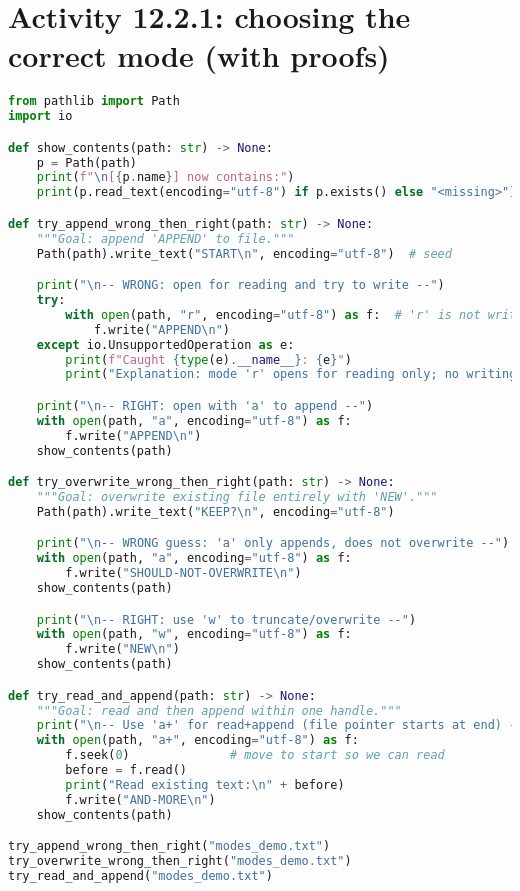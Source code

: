 \section{Activity 12.2.1: choosing the correct mode (with proofs)}
\begin{lstlisting}[language=Python, caption={Try wrong modes first; explain errors; finish with the correct mode.}]
from pathlib import Path
import io

def show_contents(path: str) -> None:
    p = Path(path)
    print(f"\n[{p.name}] now contains:")
    print(p.read_text(encoding="utf-8") if p.exists() else "<missing>")

def try_append_wrong_then_right(path: str) -> None:
    """Goal: append 'APPEND' to file."""
    Path(path).write_text("START\n", encoding="utf-8")  # seed

    print("\n-- WRONG: open for reading and try to write --")
    try:
        with open(path, "r", encoding="utf-8") as f:  # 'r' is not writable
            f.write("APPEND\n")
    except io.UnsupportedOperation as e:
        print(f"Caught {type(e).__name__}: {e}")
        print("Explanation: mode 'r' opens for reading only; no writing allowed.")

    print("\n-- RIGHT: open with 'a' to append --")
    with open(path, "a", encoding="utf-8") as f:
        f.write("APPEND\n")
    show_contents(path)

def try_overwrite_wrong_then_right(path: str) -> None:
    """Goal: overwrite existing file entirely with 'NEW'."""
    Path(path).write_text("KEEP?\n", encoding="utf-8")

    print("\n-- WRONG guess: 'a' only appends, does not overwrite --")
    with open(path, "a", encoding="utf-8") as f:
        f.write("SHOULD-NOT-OVERWRITE\n")
    show_contents(path)

    print("\n-- RIGHT: use 'w' to truncate/overwrite --")
    with open(path, "w", encoding="utf-8") as f:
        f.write("NEW\n")
    show_contents(path)

def try_read_and_append(path: str) -> None:
    """Goal: read and then append within one handle."""
    print("\n-- Use 'a+' for read+append (file pointer starts at end) --")
    with open(path, "a+", encoding="utf-8") as f:
        f.seek(0)              # move to start so we can read
        before = f.read()
        print("Read existing text:\n" + before)
        f.write("AND-MORE\n")
    show_contents(path)

try_append_wrong_then_right("modes_demo.txt")
try_overwrite_wrong_then_right("modes_demo.txt")
try_read_and_append("modes_demo.txt")
\end{lstlisting}

